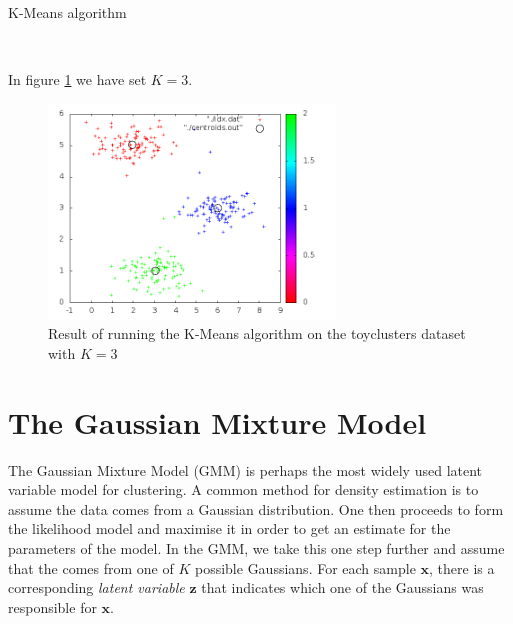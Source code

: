 \documentclass[final,3p,times,twocolumn]{elsarticle}
\DeclareMathOperator*{\argmin}{arg\,min}
\begin{document}
\begin{algorithm}
\caption{K-Means algorithm}
\label{alg:kmeans}
\begin{algorithmic}[1]
\Repeat
{}
\State{$c^{(i)} = \argmin_k ||\boldsymbol{x}_i - \boldsymbol{k}_k||$}
\EndFor
{}
\EndFor
{}
\EndProcedure \\
\end{algorithmic}
\end{algorithm}

In figure \ref{fig:kmeans1} we have set $K = 3$.
\begin{figure}
\centering
\includegraphics[width=3in]{kmeans1.png}
\caption{Result of running the K-Means algorithm on the toyclusters dataset with $K=3$}
\label{fig:kmeans1}
\end{figure}

\section{The Gaussian Mixture Model}
The Gaussian Mixture Model (GMM) is perhaps the most widely used latent variable model for clustering. A common method for density estimation is to assume the data comes from a Gaussian distribution. One then proceeds to form the likelihood model and maximise it in order to get an estimate for the parameters of the model. In the GMM, we take this one step further and assume that the comes from one of $K$ possible Gaussians. For each sample $\boldsymbol x$, there is a corresponding \emph{latent variable} $\boldsymbol z$ that indicates which one of the Gaussians was responsible for $\boldsymbol x$.
\end{document}
